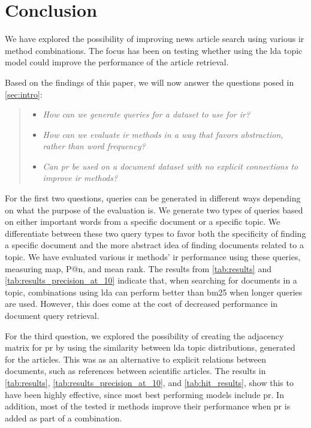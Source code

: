 \section{Conclusion}\label{sec:conclusion}
We have explored the possibility of improving news article search using various \gls{ir} method combinations.
The focus has been on testing whether using the \gls{lda} topic model could improve the performance of the article retrieval.

Based on the findings of this paper, we will now answer the questions posed in \autoref{sec:intro}:
\begin{quote}
	\begin{itemize}
		\item \emph{How can we generate queries for a dataset to use for \gls{ir}?}
		\item \emph{How can we evaluate \gls{ir} methods in a way that favors abstraction, rather than word frequency?}
		\item \emph{Can \gls{pr} be used on a document dataset with no explicit connections to improve \gls{ir} methods?}
	\end{itemize}
\end{quote}

For the first two questions, queries can be generated in different ways depending on what the purpose of the evaluation is.
We generate two types of queries based on either important words from a specific document or a specific topic.
We differentiate between these two query types to favor both the specificity of finding a specific document and the more abstract idea of finding documents related to a topic.
We have evaluated various \gls{ir} methods' \gls{ir} performance using these queries, measuring \acrlong{map}, P@n, and mean rank.
The results from \autoref{tab:results} and \autoref{tab:results_precision_at_10} indicate that, when searching for documents in a topic, combinations using \gls{lda} can perform better than \gls{bm25} when longer queries are used.
However, this does come at the cost of decreased performance in document query retrieval.

For the third question, we explored the possibility of creating the adjacency matrix for \gls{pr} by using the similarity between \gls{lda} topic distributions, generated for the articles.
This was as an alternative to explicit relations between documents, such as references between scientific articles.
The results in \autoref{tab:results}, \autoref{tab:results_precision_at_10}, and \autoref{tab:hit_results}, show this to have been highly effective, since most best performing models include \gls{pr}.
In addition, most of the tested \gls{ir} methods improve their performance when \gls{pr} is added as part of a combination.
